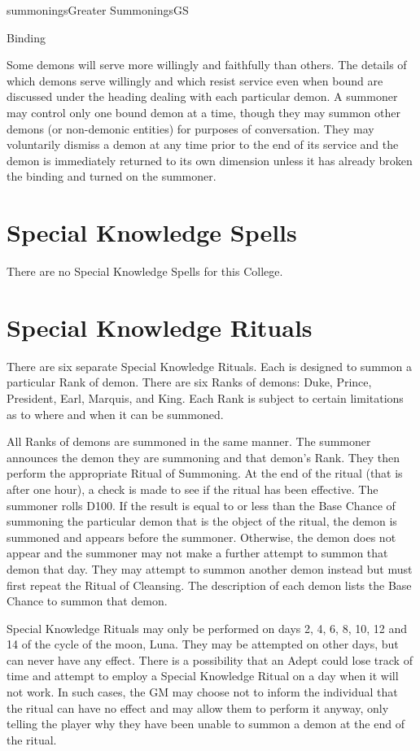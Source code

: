 \begin{College}[1.0]{summonings}{Greater Summonings}{GS}
\begin{ritual}[Q-6]{Binding}
\begin{effects}
Some demons will serve more willingly and faithfully than others.  The
details of which demons serve willingly and which resist service even
when bound are discussed under the heading dealing with each
particular demon.  A summoner may control only one bound demon at a
time, though they may summon other demons (or non-demonic entities)
for purposes of conversation.  They may voluntarily dismiss a demon at
any time prior to the end of its service and the demon is immediately
returned to its own dimension unless it has already broken the binding
and turned on the summoner.

\end{effects}
\end{ritual}

\section{Special Knowledge Spells}

There are no Special Knowledge Spells for this College.

\section{Special Knowledge Rituals}
\label{summoning:specialrituals}
There are six separate Special Knowledge Rituals.  Each is designed to
summon a particular Rank of demon.  There are six Ranks of demons:
Duke, Prince, President, Earl, Marquis, and King.  Each Rank is
subject to certain limitations as to where and when it can be
summoned.

All Ranks of demons are summoned in the same manner. The summoner
announces the demon they are summoning and that demon’s Rank. They
then perform the appropriate Ritual of Summoning.  At the end of the
ritual (that is after one hour), a check is made to see if the ritual
has been effective. The summoner rolls D100.  If the result is equal
to or less than the Base Chance of summoning the particular demon that
is the object of the ritual, the demon is summoned and appears before
the summoner. Otherwise, the demon does not appear and the summoner
may not make a further attempt to summon that demon that day. They may
attempt to summon another demon instead but must first repeat the
Ritual of Cleansing.  The description of each demon lists the Base
Chance to summon that demon.

Special Knowledge Rituals may only be performed on days 2, 4, 6, 8,
10, 12 and 14 of the cycle of the moon, Luna. They may be attempted on
other days, but can never have any effect. There is a possibility that
an Adept could lose track of time and attempt to employ a Special
Knowledge Ritual on a day when it will not work.  In such cases, the
GM may choose not to inform the individual that the ritual can have no
effect and may allow them to perform it anyway, only telling the
player why they have been unable to summon a demon at the end of the
ritual.


\end{College}
